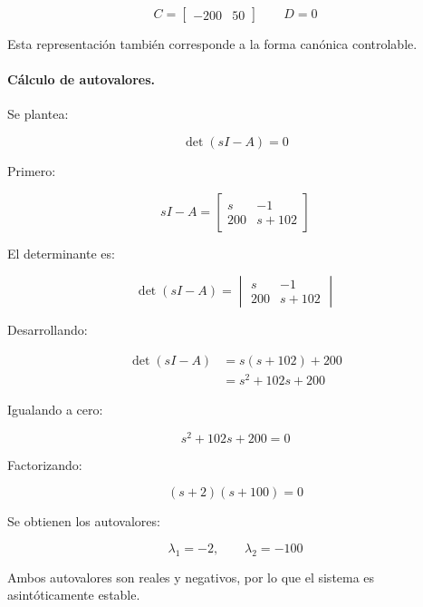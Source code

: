 \documentclass[12pt,a4paper]{article}
\begin{document}
\begin{equation}\boxed{C=\begin{bmatrix}-200&50\end{bmatrix} \qquad D=0}\end{equation}

Esta representación también corresponde a la forma canónica controlable.
\paragraph{Cálculo de autovalores.} Se plantea:

\begin{equation}\det(sI-A)=0\end{equation}

Primero:

\begin{equation}sI-A=\begin{bmatrix}s&-1\\200&s+102\end{bmatrix}\end{equation}

El determinante es:

\begin{equation}\det(sI-A)=\begin{vmatrix}s&-1\\200&s+102\end{vmatrix}\end{equation}

Desarrollando:

\begin{align}\det(sI-A)&=s(s+102)+200\\&=s^2+102s+200\end{align}

Igualando a cero:

\begin{equation}s^2+102s+200=0\end{equation}

Factorizando:

\begin{equation}(s+2)(s+100)=0\end{equation}

Se obtienen los autovalores:

\begin{equation}\boxed{\lambda_1=-2,\qquad \lambda_2=-100}\end{equation}

Ambos autovalores son reales y negativos, por lo que el sistema es asintóticamente estable.
\end{document}

